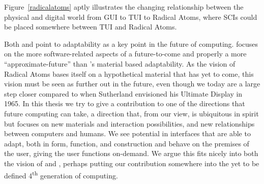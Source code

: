 Figure~\ref{radicalatoms} aptly illustrates the changing relationship between the physical and digital world from GUI to TUI to Radical Atoms, where SCIs could be placed somewhere between TUI and Radical Atoms.

Both \citeauthor{ishii2012radical} and \citeauthor{abowd2012next} point to adaptability as a key point in the future of computing.
\citeauthor{abowd2012next} focuses on the more software-related aspects of a future-to-come and properly a more ``approximate-future'' than \citeauthor{ishii2012radical}'s material based adaptability.
As the vision of Radical Atoms bases itself on a hypothetical material that has yet to come, this vision must be seen as further out in the future, even though we today are a large step closer compared to when Sutherland envisioned his Ultimate Display in 1965. 
\blank
{}
In this thesis we try to give a contribution to one of the directions that future computing can take, a direction that, from our view, is ubiquitous in spirit but focuses on new materials and interaction possibilities, and new relationships between computers and humans.
We see potential in interfaces that are able to adapt, both in form, function, and construction and behave on the premises of the user, giving the user functions on-demand.
We argue this fits nicely into both the vision of \citeauthor{abowd2012next} and \citeauthor{ishii2012radical}, perhaps putting our contribution somewhere into the yet to be defined 4\textsuperscript{th} generation of computing.

